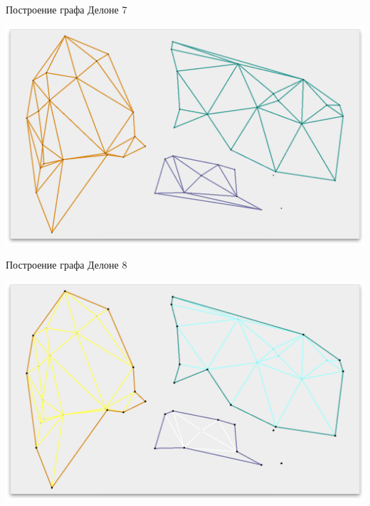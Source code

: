 \documentclass[14pt, fleqn, xcolor={dvipsnames, table}]{beamer}
\begin{document}
        \begin{frame}{Построение графа Делоне 7}
            \begin{center}
                \includegraphics[scale=0.295]{7.png}
            \end{center}             
        \end{frame}
        
        \begin{frame}{Построение графа Делоне 8}
            \begin{center}
                \includegraphics[scale=0.295]{8.png}
            \end{center}             
        \end{frame}
        
\end{document}
